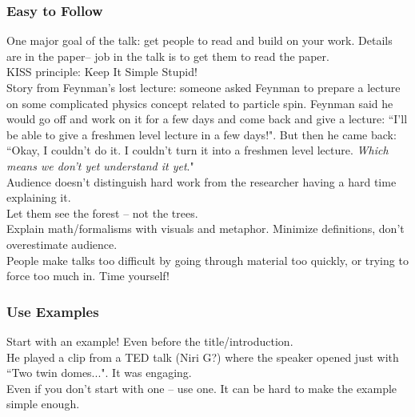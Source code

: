 \subsubsection{Easy to Follow}

One major goal of the talk: get people to read and build on your work. Details are in the paper-- job in the talk is to get them to read the paper. \\

KISS principle: Keep It Simple Stupid! \\

Story from Feynman's lost lecture: someone asked Feynman to prepare a lecture on some complicated physics concept related to particle spin. Feynman said he would go off and work on it for a few days and come back and give a lecture: ``I'll be able to give a freshmen level lecture in a few days!". But then he came back: ``Okay, I couldn't do it. I couldn't turn it into a freshmen level lecture. {\it Which means we don't yet understand it yet}." \\

Audience doesn't distinguish hard work from the researcher having a hard time explaining it. \\

Let them see the forest -- not the trees. \\

Explain math/formalisms with visuals and metaphor. Minimize definitions, don't overestimate audience. \\

People make talks too difficult by going through material too quickly, or trying to force too much in. Time yourself!

\subsubsection{Use Examples}

Start with an example! Even before the title/introduction.  \\

He played a clip from a TED talk (Niri G?) where the speaker opened just with ``Two twin domes...". It was engaging. \\

Even if you don't start with one -- use one. It can be hard to make the example simple enough. \\

